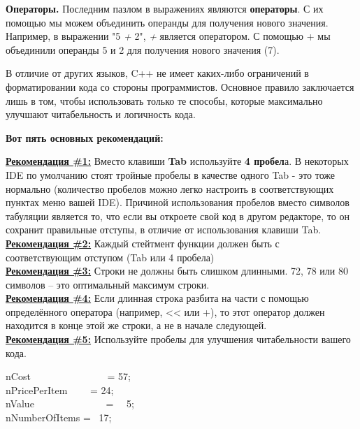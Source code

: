 \documentclass[a4paper,16pt]{report} %
\begin{document}
\textbf{Операторы.}
Последним пазлом в выражениях являются \textbf{операторы}. С их помощью мы можем объединить операнды для получения нового значения. Например, в выражении "5 \textit{+} 2", \textit{+} является оператором. С помощью + мы объединили операнды 5 и 2 для получения нового значения (7).
\\
\begin{sloppypar}
В отличие от других языков, C++ не имеет каких-либо ограничений в форматировании кода со стороны программистов. Основное правило заключается лишь в том, чтобы использовать только те способы, которые максимально улучшают читабельность и логичность кода.
\end{sloppypar}

\begin{center}
	\textbf{Вот пять основных рекомендаций:}
\end{center}

\begin{flushleft}
	\textbf{\underline{Рекомендация \#1:}} Вместо клавиши \textbf{Tab} используйте \textbf{4 пробел}а. В некоторых IDE по умолчанию стоят тройные пробелы в качестве одного Tab - это тоже нормально (количество пробелов можно легко настроить в соответствующих пунктах меню вашей IDE).
Причиной использования пробелов вместо символов табуляции является то, что если вы откроете свой код в другом редакторе, то он сохранит правильные отступы, в отличие от использования клавиши Tab.
\\
\textbf{\underline{Рекомендация \#2:}} Каждый стейтмент функции должен быть с
соответствующим отступом (Tab или 4 пробела)
\\
\textbf{\underline{Рекомендация \#3:}} Строки не должны быть слишком длинными. 72, 78 или 80 символов – это оптимальный максимум строки.
\\
\textbf{\underline{Рекомендация \#4:}} Если длинная строка разбита на части с помощью определённого оператора (например, << или +), то этот оператор должен находится в конце этой же строки, а не в начале следующей.
\\
\textbf{\underline{Рекомендация \#5:}} Используйте пробелы для улучшения читабельности вашего кода.
\end{flushleft}


\begin{flushleft}
nCost \ \ \ \ \ \ \ \ \ \ \ \ \ \ \ = 57;\\
nPricePerItem \ \ \ \  = 24;\\
nValue \ \ \ \ \ \ \ \ \ \ \ \ \ \ = \ \ 5;\\
nNumberOfItems = \ 17;\\
\end{flushleft}
\end{document}

